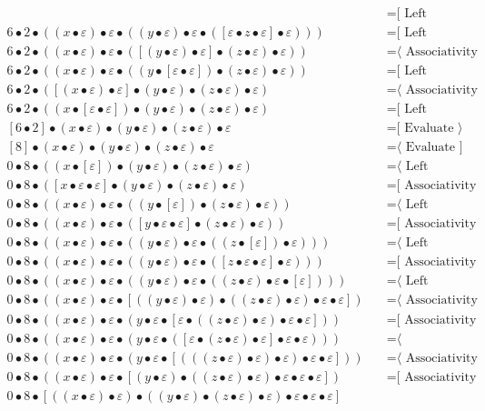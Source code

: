 \documentclass{article}
\begin{document}
\begin{align*}
  & \quad \text{=[ Left neutrality ⟩}\\
6 • 2 • ((x • ε) • ε • ((y • ε) • ε • ([ε • z • ε] • ε)))
  & \quad \text{=[ Left neutrality ⟩}\\
6 • 2 • ((x • ε) • ε • ([(y • ε) • ε] • (z • ε) • ε))
  & \quad \text{=⟨ Associativity ]}\\
6 • 2 • ((x • ε) • ε • ((y • [ε • ε]) • (z • ε) • ε))
  & \quad \text{=[ Left neutrality ⟩}\\
6 • 2 • ([(x • ε) • ε] • (y • ε) • (z • ε) • ε)
  & \quad \text{=⟨ Associativity ]}\\
6 • 2 • ((x • [ε • ε]) • (y • ε) • (z • ε) • ε)
  & \quad \text{=[ Left neutrality ⟩}\\
[6 • 2] • (x • ε) • (y • ε) • (z • ε) • ε
  & \quad \text{=[ Evaluate ⟩}\\
[8] • (x • ε) • (y • ε) • (z • ε) • ε
  & \quad \text{=⟨ Evaluate ]}\\
0 • 8 • ((x • [ε]) • (y • ε) • (z • ε) • ε)
  & \quad \text{=⟨ Left neutrality ]}\\
0 • 8 • ([x • ε • ε] • (y • ε) • (z • ε) • ε)
  & \quad \text{=[ Associativity ⟩}\\
0 • 8 • ((x • ε) • ε • ((y • [ε]) • (z • ε) • ε))
  & \quad \text{=⟨ Left neutrality ]}\\
0 • 8 • ((x • ε) • ε • ([y • ε • ε] • (z • ε) • ε))
  & \quad \text{=[ Associativity ⟩}\\
0 • 8 • ((x • ε) • ε • ((y • ε) • ε • ((z • [ε]) • ε)))
  & \quad \text{=⟨ Left neutrality ]}\\
0 • 8 • ((x • ε) • ε • ((y • ε) • ε • ([z • ε • ε] • ε)))
  & \quad \text{=[ Associativity ⟩}\\
0 • 8 • ((x • ε) • ε • ((y • ε) • ε • ((z • ε) • ε • [ε])))
  & \quad \text{=⟨ Left neutrality ]}\\
0 • 8 • ((x • ε) • ε • [((y • ε) • ε) • ((z • ε) • ε) • ε • ε])
  & \quad \text{=⟨ Associativity ]}\\
0 • 8 • ((x • ε) • ε • (y • ε • [ε • ((z • ε) • ε) • ε • ε]))
  & \quad \text{=[ Associativity ⟩}\\
0 • 8 • ((x • ε) • ε • (y • ε • ([ε • (z • ε) • ε] • ε • ε)))
  & \quad \text{=⟨ Commutativity ]}\\
0 • 8 • ((x • ε) • ε • (y • ε • [(((z • ε) • ε) • ε) • ε • ε]))
  & \quad \text{=⟨ Associativity ]}\\
0 • 8 • ((x • ε) • ε • [(y • ε) • ((z • ε) • ε) • ε • ε • ε])
  & \quad \text{=[ Associativity ⟩}\\
0 • 8 • [((x • ε) • ε) • ((y • ε) • (z • ε) • ε) • ε • ε • ε]

\end{align*}
\end{document}
